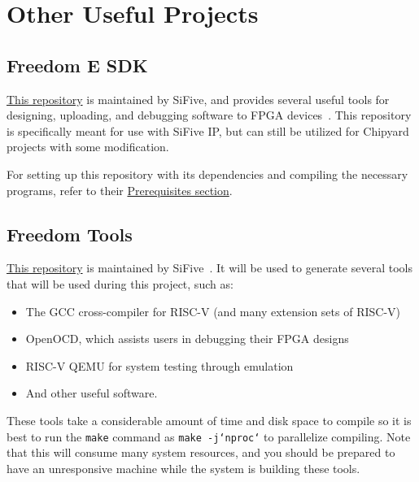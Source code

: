 \section{Other Useful Projects}\label{sec:Other_Useful_Projects}
\subsection{Freedom E SDK}\label{sec:Freedom_E_SDK}
\href{https://github.com/sifive/freedom-e-sdk}{This repository} is maintained by SiFive, and provides several useful tools for designing, uploading, and debugging software to FPGA devices~\cite{freedomESDK}.
This repository is specifically meant for use with SiFive IP, but can still be utilized for Chipyard projects with some modification.

For setting up this repository with its dependencies and compiling the necessary programs, refer to their \href{https://github.com/sifive/freedom-e-sdk#setting-up-the-sdk}{Prerequisites section}.

\subsection{Freedom Tools}\label{sec:Freedom_Tools}
\href{https://github.com/sifive/freedom-tools}{This repository} is maintained by SiFive~\cite{freedomTools}.
It will be used to generate several tools that will be used during this project, such as:
\begin{itemize}
\item The GCC cross-compiler for RISC-V (and many extension sets of RISC-V)
\item OpenOCD, which assists users in debugging their FPGA designs
\item RISC-V QEMU for system testing through emulation
\item And other useful software.
\end{itemize}

These tools take a considerable amount of time and disk space to compile so it is best to run the \texttt{make} command as \texttt{make -j`nproc`} to parallelize compiling.
Note that this will consume many system resources, and you should be prepared to have an unresponsive machine while the system is building these tools.


